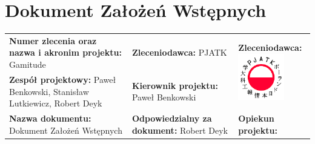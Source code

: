 \documentclass[a4paper,11pt]{report}
\begin{document}
\chapter{Dokument Założeń Wstępnych}
\begin{tabular}{|p{5cm}|p{5cm}|p{5cm}|}
\hline
\textbf{Numer zlecenia oraz nazwa i akronim projektu: } Gamitude &\textbf{Zleceniodawca: } PJATK & \multicolumn{1}{l|}{\multirow{2}{*}{\textbf{Zleceniodawca: }\newline
 \includegraphics[width=2cm, height=2cm]{image1.png} }}\\
\cline{1-2}
\textbf{Zespół projektowy: } Paweł Benkowski, Stanisław Lutkiewicz, Robert Deyk & \textbf{Kierownik projektu: } Paweł Benkowski &\\
\hline
\textbf{Nazwa dokumentu: } Dokument Założeń Wstępnych & \textbf{Odpowiedzialny za dokument: } Robert Deyk &\textbf{Opiekun projektu: } \\
\hline
\end{tabular}\\
\end{document}
